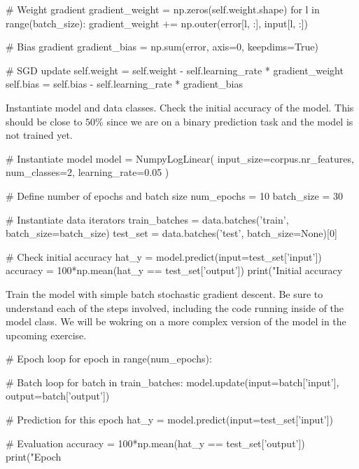 \begin{exercise}
\begin{python}
        # Weight gradient
        gradient_weight = np.zeros(self.weight.shape)
        for l in range(batch_size):
            gradient_weight += np.outer(error[l, :], input[l, :])

        # Bias gradient
        gradient_bias = np.sum(error, axis=0, keepdims=True)

        # SGD update
        self.weight = self.weight - self.learning_rate * gradient_weight
        self.bias = self.bias - self.learning_rate * gradient_bias
\end{python}
Instantiate model and data classes. Check the initial accuracy of the model. This should be close to $50\%$ since we are on a binary prediction task and the model is not trained yet.
\begin{python}
# Instantiate model
model = NumpyLogLinear(
    input_size=corpus.nr_features,
    num_classes=2,
    learning_rate=0.05
)

# Define number of epochs and batch size
num_epochs = 10
batch_size = 30

# Instantiate data iterators
train_batches = data.batches('train', batch_size=batch_size)
test_set = data.batches('test', batch_size=None)[0]

# Check initial accuracy
hat_y = model.predict(input=test_set['input'])
accuracy = 100*np.mean(hat_y == test_set['output'])
print("Initial accuracy %

\end{python}
Train the model with simple batch stochastic gradient descent. Be sure to understand each of the steps involved, including the code running inside of the model class. We will be wokring on a more complex version of the model in the upcoming exercise.
\begin{python}
# Epoch loop
for epoch in range(num_epochs):

    # Batch loop
    for batch in train_batches:
        model.update(input=batch['input'], output=batch['output'])

    # Prediction for this epoch
    hat_y = model.predict(input=test_set['input'])

    # Evaluation
    accuracy = 100*np.mean(hat_y == test_set['output'])
    print("Epoch %
\end{python}

\end{exercise}




